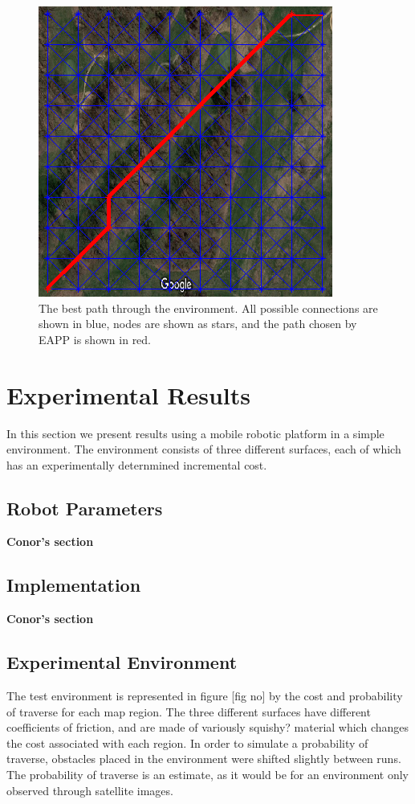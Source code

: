 \documentclass[journal]{IEEEtran}
\begin{document}
\begin{figure}[h!]
\label{best_path}
\centering
\includegraphics[scale=1]{RCP_soln}
\caption{The best path through the environment. All possible connections are shown in blue, nodes are shown as stars, and the path chosen by EAPP is shown in red.}

\end{figure}

\section{Experimental Results}
In this section we present results using a mobile robotic platform in a simple environment. 
The environment consists of three different surfaces, each of which has an experimentally deternmined incremental cost.

\subsection{Robot Parameters}
\textbf{Conor's section}

\subsection{Implementation}
\textbf{Conor's section}

\subsection{Experimental Environment}
The test environment is represented in figure [fig no] by the cost and probability of traverse for each map region. 
The three different surfaces have different coefficients of friction, and are made of variously squishy? material which changes the cost associated with each region. 
In order to simulate a probability of traverse, obstacles placed in the environment were shifted slightly between runs. 
The probability of traverse is an estimate, as it would be for an environment only observed through satellite images.
\end{document}
